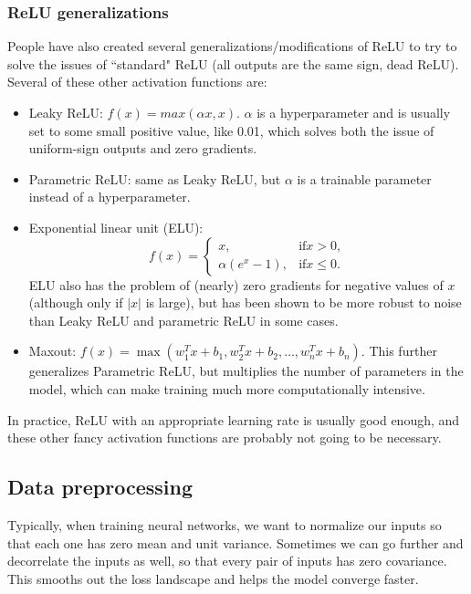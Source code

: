 \subsubsection{ReLU generalizations}
People have also created several generalizations/modifications of ReLU to try to solve the issues of ``standard" ReLU (all outputs are the same sign, dead ReLU). Several of these other activation functions are:
\begin{itemize}
\item Leaky ReLU: $f(x) = max(\alpha x, x)$. $\alpha$ is a hyperparameter and is usually set to some small positive value, like 0.01, which solves both the issue of uniform-sign outputs and zero gradients.
\item Parametric ReLU: same as Leaky ReLU, but $\alpha$ is a trainable parameter instead of a hyperparameter.
\item Exponential linear unit (ELU):
\begin{equation*}
f(x) = 
\begin{cases}
x, &\text{if} x > 0,\\
\alpha(e^x - 1), &\text{if} x \le 0.
\end{cases}
\end{equation*}
ELU also has the problem of (nearly) zero gradients for negative values of $x$ (although only if $|x|$ is large), but has been shown to be more robust to noise than Leaky ReLU and parametric ReLU in some cases.
\item Maxout: $f(x) = \max(w_1^Tx + b_1, w_2^Tx + b_2, \dots, w_n^Tx + b_n).$ This further generalizes Parametric ReLU, but multiplies the number of parameters in the model, which can make training much more computationally intensive.
\end{itemize}
In practice, ReLU with an appropriate learning rate is usually good enough, and these other fancy activation functions are probably not going to be necessary.

\subsection{Data preprocessing}
Typically, when training neural networks, we want to normalize our inputs so that each one has zero mean and unit variance. Sometimes we can go further and decorrelate the inputs as well, so that every pair of inputs has zero covariance. This smooths out the loss landscape and helps the model converge faster.


